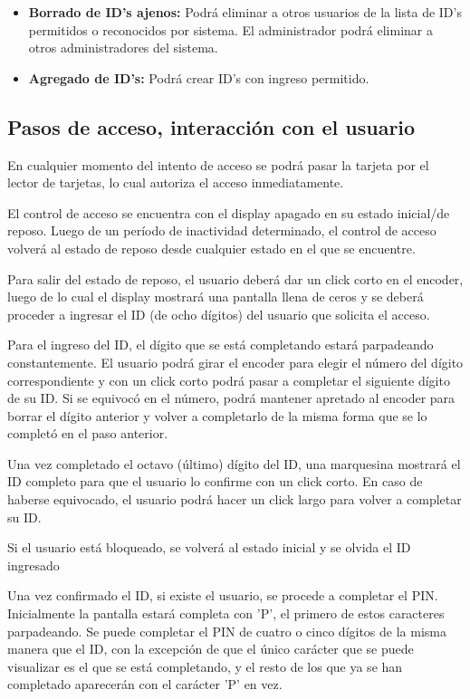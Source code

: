 \documentclass[10pt,a4paper]{article}
\begin{document}
\begin{itemize}
\item \textbf{Borrado de ID's ajenos: } Podrá eliminar a otros usuarios de la lista de ID's permitidos o reconocidos por sistema. El administrador podrá eliminar a otros administradores del sistema.
\item \textbf{Agregado de ID's: } Podrá crear ID's con ingreso permitido.

\end{itemize}

\subsection{Pasos de acceso, interacción con el usuario}
En cualquier momento del intento de acceso se podrá pasar la tarjeta por el lector de tarjetas, lo cual autoriza el acceso inmediatamente.\par
El control de acceso se encuentra con el display apagado en su estado inicial/de reposo. Luego de un período de inactividad determinado, el control de acceso volverá al estado de reposo desde cualquier estado en el que se encuentre.\par
Para salir del estado de reposo, el usuario deberá dar un click corto en el encoder, luego de lo cual el display mostrará una pantalla llena de ceros y se deberá proceder a ingresar el ID (de ocho dígitos) del usuario que solicita el acceso. \par
Para el ingreso del ID, el dígito que se está completando estará parpadeando constantemente. El usuario podrá girar el encoder para elegir el número del dígito correspondiente y con un click corto podrá pasar a completar el siguiente dígito de su ID. Si se equivocó en el número, podrá mantener apretado al encoder para borrar el dígito anterior y volver a completarlo de la misma forma que se lo completó en el paso anterior. \par
Una vez completado el octavo (último) dígito del ID, una marquesina mostrará el ID completo para que el usuario lo confirme con un click corto. En caso de haberse equivocado, el usuario podrá hacer un click largo para volver a completar su ID.\par
Si el usuario está bloqueado, se volverá al estado inicial y se olvida el ID ingresado\par
Una vez confirmado el ID, si existe el usuario, se procede a completar el PIN. Inicialmente la pantalla estará completa con 'P', el primero de estos caracteres parpadeando. Se puede completar el PIN de cuatro o cinco dígitos de la misma manera que el ID, con la excepción de que el único carácter que se puede visualizar es el que se está completando, y el resto de los que ya se han completado aparecerán con el carácter 'P' en vez. \par
\end{document}
